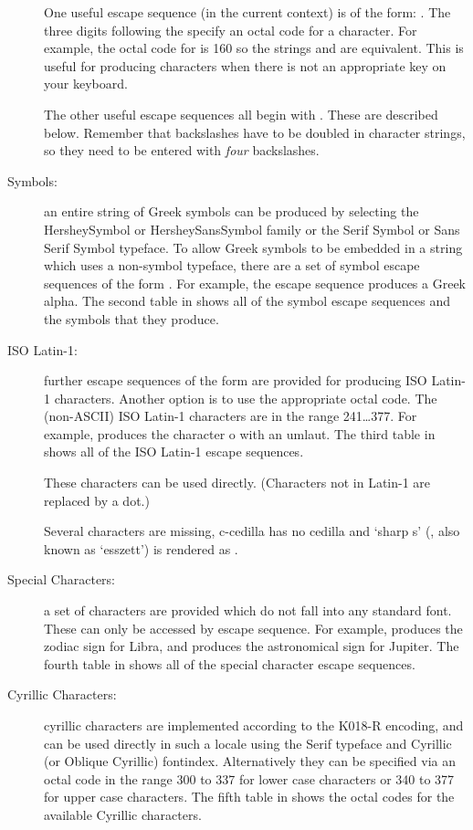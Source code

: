 \begin{Details}
\begin{description}
One useful escape sequence (in the current context) is of the
form: .  The three digits following the \samp{\bsl{}}
specify an octal code for a character.  For example, the octal
code for  is 160 so the strings  and
 are equivalent. This is useful for producing
characters when there is not an appropriate key on your keyboard.

The other useful escape sequences all begin with \samp{\bsl{}\bsl{}}.
These are described below.  Remember that backslashes have to be
doubled in \R{} character strings, so they need to be entered with
\emph{four} backslashes.


\item[Symbols:] an entire string of Greek symbols can be produced by
selecting the HersheySymbol or HersheySansSymbol family or the
Serif Symbol or Sans Serif Symbol typeface.  To allow Greek
symbols to be embedded in a string which uses a non-symbol
typeface, there are a set of symbol escape sequences of the form
. For example, the escape sequence 
produces a Greek alpha.  The second table in 
shows all of the symbol escape sequences and the symbols that they
produce.


\item[ISO Latin-1:] further escape sequences of the form
 are provided for producing ISO Latin-1 characters.
Another option is to use the appropriate octal code.  The
(non-ASCII) ISO Latin-1 characters are in the range 241\dots377.
For example,  produces the character o with an umlaut.
The third table in  shows all of the ISO
Latin-1 escape sequences.

These characters can be used directly.  (Characters not in Latin-1
are replaced by a dot.)

Several characters are missing, c-cedilla has no cedilla and
`sharp s' (, also known as `esszett')
is rendered as .


\item[Special Characters:] a set of characters are provided which
do not fall into any standard font.  These can only be accessed by
escape sequence.  For example,  produces the zodiac sign for
Libra, and  produces the astronomical sign for Jupiter.
The fourth table in  shows all of the
special character escape sequences.


\item[Cyrillic Characters:] cyrillic characters are implemented
according to the K018-R encoding, and can be used directly in such
a locale using the Serif typeface and Cyrillic (or Oblique Cyrillic)
fontindex.  Alternatively they can be specified via an octal code
in the range 300 to 337 for lower case characters or 340 to 377 for
upper case characters.  The fifth table in  shows the
octal codes for the available Cyrillic characters.


\end{description}
\end{Details}
